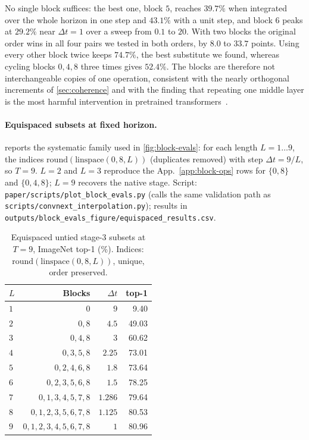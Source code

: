 No single block suffices: the best one, block $5$, reaches $39.7\%$ when integrated
over the whole horizon in one step and $43.1\%$ with a unit step, and block $6$ peaks
at $29.2\%$ near $\Delta t{=}1$ over a sweep from $0.1$ to $20$.
With two blocks the original order wins in all four pairs we tested in both orders,
by $8.0$ to $33.7$ points.
Using every other block twice keeps $74.7\%$, the best substitute we found, whereas
cycling blocks $0,4,8$ three times gives $52.4\%$.
The blocks are therefore not interchangeable copies of one operation, consistent
with the nearly orthogonal increments of \cref{sec:coherence} and with
the finding that repeating one middle layer is the most harmful intervention in
pretrained transformers~\citep{sun2025painters}.

\paragraph{Equispaced subsets at fixed horizon.}
 reports the systematic family used in
\cref{fig:block-evals}: for each length $L{=}1{\ldots}9$, the indices
$\mathrm{round}(\mathrm{linspace}(0,8,L))$ (duplicates removed) with step
$\Delta t{=}9/L$, so $T{=}9$.
$L{=}2$ and $L{=}3$ reproduce the App.~\ref{app:block-ops} rows for $\{0,8\}$ and
$\{0,4,8\}$; $L{=}9$ recovers the native stage.
Script: \texttt{paper/scripts/plot\_block\_evals.py} (calls the same validation path as
\texttt{scripts/convnext\_interpolation.py}); results in
\texttt{outputs/block\_evals\_figure/equispaced\_results.csv}.

\begin{table}[t]
    \centering
    \caption{Equispaced untied stage-3 subsets at $T{=}9$, ImageNet top-1 (\%).
    Indices: $\mathrm{round}(\mathrm{linspace}(0,8,L))$, unique, order preserved.}
    \label{tab:app-equispaced}
    \small
    \setlength{\tabcolsep}{3pt}
    \begin{tabular}{lrrr}
        \toprule
        $L$ & Blocks & $\Delta t$ & top-1 \\
        \midrule
        $1$ & $0$                         & $9$     & 9.40 \\
        $2$ & $0,8$                       & $4.5$   & 49.03 \\
        $3$ & $0,4,8$                     & $3$     & 60.62 \\
        $4$ & $0,3,5,8$                   & $2.25$  & 73.01 \\
        $5$ & $0,2,4,6,8$                 & $1.8$   & 73.64 \\
        $6$ & $0,2,3,5,6,8$               & $1.5$   & 78.25 \\
        $7$ & $0,1,3,4,5,7,8$             & $1.286$ & 79.64 \\
        $8$ & $0,1,2,3,5,6,7,8$           & $1.125$ & 80.53 \\
        $9$ & $0,1,2,3,4,5,6,7,8$         & $1$     & 80.96 \\
        \bottomrule
    \end{tabular}
\end{table}
